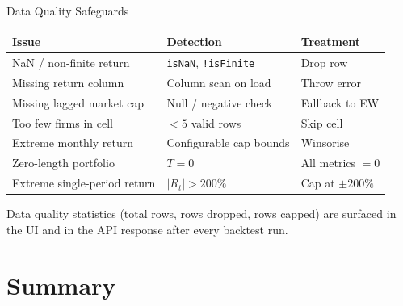 \documentclass[aspectratio=169, 12pt]{beamer}
\begin{document}
\begin{frame}{Data Quality Safeguards}
  \begin{center}
  \begin{tabular}{lll}
    \toprule
    Issue & Detection & Treatment \\
    \midrule
    NaN / non-finite return & \texttt{isNaN}, \texttt{!isFinite} & Drop row \\
    Missing return column & Column scan on load & Throw error \\
    Missing lagged market cap & Null / negative check & Fallback to EW \\
    Too few firms in cell & $< 5$ valid rows & Skip cell \\
    Extreme monthly return & Configurable cap bounds & Winsorise \\
    Zero-length portfolio & $T = 0$ & All metrics $= 0$ \\
    Extreme single-period return & $|R_t| > 200\%$ & Cap at $\pm 200\%$ \\
    \bottomrule
  \end{tabular}
  \end{center}
  \vspace{4pt}
  Data quality statistics (total rows, rows dropped, rows capped) are surfaced
  in the UI and in the API response after every backtest run.
\end{frame}

\section{Summary}
\end{document}

